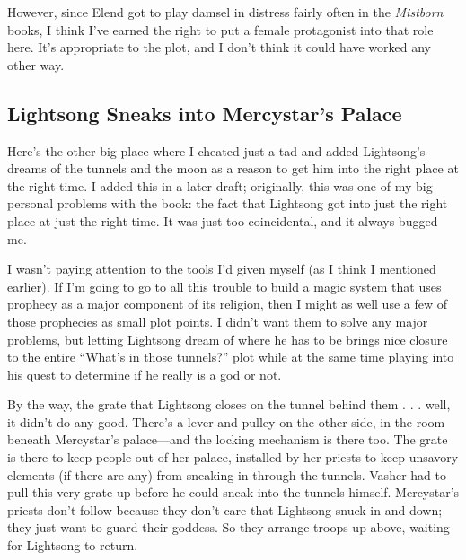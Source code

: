 However, since Elend got to play damsel in distress fairly often in the \textit{Mistborn} books, I think I’ve earned the right to put a female protagonist into that role here. It’s appropriate to the plot, and I don’t think it could have worked any other way.

\subsection*{Lightsong Sneaks into Mercystar’s Palace}

Here’s the other big place where I cheated just a tad and added Lightsong’s dreams of the tunnels and the moon as a reason to get him into the right place at the right time. I added this in a later draft; originally, this was one of my big personal problems with the book: the fact that Lightsong got into just the right place at just the right time. It was just too coincidental, and it always bugged me.

I wasn’t paying attention to the tools I’d given myself (as I think I mentioned earlier). If I’m going to go to all this trouble to build a magic system that uses prophecy as a major component of its religion, then I might as well use a few of those prophecies as small plot points. I didn’t want them to solve any major problems, but letting Lightsong dream of where he has to be brings nice closure to the entire “What’s in those tunnels?” plot while at the same time playing into his quest to determine if he really is a god or not.

By the way, the grate that Lightsong closes on the tunnel behind them . . . well, it didn’t do any good. There’s a lever and pulley on the other side, in the room beneath Mercystar’s palace—and the locking mechanism is there too. The grate is there to keep people out of her palace, installed by her priests to keep unsavory elements (if there are any) from sneaking in through the tunnels. Vasher had to pull this very grate up before he could sneak into the tunnels himself. Mercystar’s priests don’t follow because they don’t care that Lightsong snuck in and down; they just want to guard their goddess. So they arrange troops up above, waiting for Lightsong to return.




